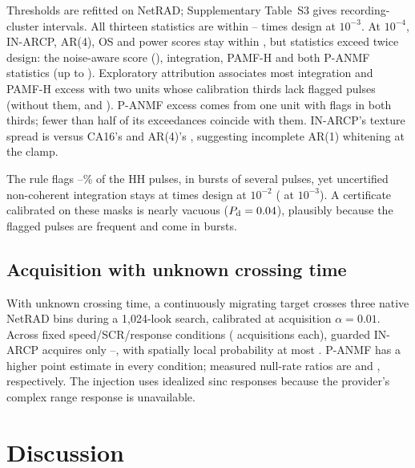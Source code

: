 \documentclass[journal]{IEEEtran}
\begin{document}
Thresholds are refitted on NetRAD; Supplementary Table~S3 gives recording-cluster intervals. All thirteen statistics are within \NetConfMinThree--\NetConfMaxThree{} times design at $10^{-3}$. At $10^{-4}$, IN-ARCP, AR(4), OS and power scores stay within \NetPerLookMax{}, but \NetNOverTwoFourWord{} statistics exceed twice design: the noise-aware score (\NetNaFour), integration, PAMF-H and both P-ANMF statistics (up to \NetDwellMax). Exploratory attribution associates most integration and PAMF-H excess with two units whose calibration thirds lack flagged pulses (without them, \NetAttrDin{} and \NetAttrPamf). P-ANMF excess comes from one unit with flags in both thirds; fewer than half of its exceedances coincide with them. IN-ARCP's texture spread is \NetSpreadIn{} versus CA16's \NetSpreadCa{} and AR(4)'s \NetSpreadInFour{}, suggesting incomplete AR(1) whitening at the clamp.

The rule flags \NetHitHHMin--\NetHitHHMax\% of the HH pulses, in bursts of several pulses, yet uncertified non-coherent integration stays at \NetWDin{} times design at $10^{-2}$ (\NetWDinThree{} at $10^{-3}$). A certificate calibrated on these masks is nearly vacuous ($P_{\rm d}=0.04$), plausibly because the flagged pulses are frequent and come in bursts.

\subsection{Acquisition with unknown crossing time}
With unknown crossing time, a continuously migrating target crosses three native NetRAD bins during a 1,024-look search, calibrated at acquisition $\alpha=0.01$. Across \MigrationConditions{} fixed speed/SCR/response conditions (\MigrationWindows{} acquisitions each), guarded IN-ARCP acquires only \MigrationINMin--\MigrationINMax{}, with spatially local probability at most \MigrationLocalMax. P-ANMF has a higher point estimate in every condition; measured null-rate ratios are \MigrationINNull{} and \MigrationPANMFNull{}, respectively. The injection uses idealized sinc responses because the provider's complex range response is unavailable.

\section{Discussion}\label{sec:discussion}
\end{document}
